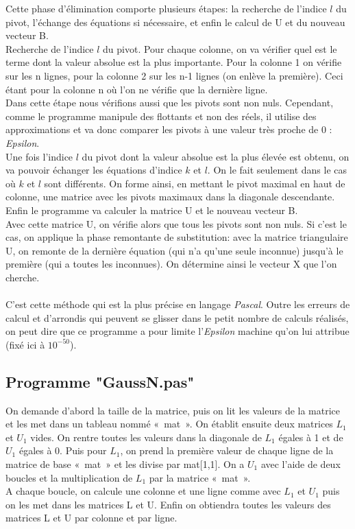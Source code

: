 \documentclass[a4paper,12pt]{report}
\begin{document}
Cette phase d'élimination comporte plusieurs étapes: la recherche de l'indice $l$ du pivot, l'échange des équations si nécessaire, et enfin le calcul de U et du nouveau vecteur B.\\

Recherche de l'indice $l$ du pivot.
Pour chaque colonne, on va vérifier quel est le terme dont la valeur absolue est la plus importante. Pour la colonne 1 on vérifie sur les n lignes, pour la colonne 2 sur les n-1 lignes (on enlève la première). Ceci étant pour la colonne n où l'on ne vérifie que la dernière ligne.\\

Dans cette étape nous vérifions aussi que les pivots sont non nuls. Cependant, comme le programme manipule des flottants et non des réels, il utilise des approximations et va donc comparer les pivots à une valeur très proche de 0 : \textit{Epsilon}.\\

Une fois l'indice $l$ du pivot dont la valeur absolue est la plus élevée est obtenu, on va pouvoir échanger les équations d'indice $k$ et $l$. On le fait seulement dans le cas où $k$ et $l$ sont différents. On forme ainsi, en mettant le pivot maximal en haut de colonne, une matrice avec les pivots maximaux dans la diagonale descendante.\\

Enfin le programme va calculer la matrice U et le nouveau vecteur B.
\\Avec cette matrice U, on vérifie alors que tous les pivots sont non nuls. Si c'est le cas, on applique la phase remontante de substitution: avec la matrice triangulaire U, on remonte de la dernière équation (qui n'a qu'une seule inconnue) jusqu'à le première (qui a toutes les inconnues). On détermine ainsi le vecteur X que l'on cherche.
\\\\C'est cette méthode qui est la plus précise en langage \textit{Pascal}. Outre les erreurs de calcul et d'arrondis qui peuvent se glisser dans le petit nombre de calculs réalisés, on peut dire que ce programme a pour limite l'\textit{Epsilon} machine qu'on lui attribue (fixé ici à $10^{-50}$). 

\subsection{Programme "GaussN.pas"}
On demande d'abord la taille de la matrice, puis on lit les valeurs de la matrice et les met dans un tableau nommé « mat ». On établit ensuite deux matrices $L_{1}$ et $U_{1}$ vides. On rentre toutes les valeurs dans la diagonale de $L_{1}$ égales à 1 et de $U_{1}$ égales à 0. Puis pour $L_{1}$, on prend la première valeur de chaque ligne de la matrice de base « mat » et les divise par mat[1,1]. On a $U_{1}$ avec l'aide de deux boucles et la multiplication de $L_{1}$ par la matrice « mat ».\\
A chaque boucle, on calcule une colonne et une ligne comme avec $L_{1}$ et $U_{1}$ puis on les met dans les matrices L et U. Enfin on obtiendra toutes les valeurs des matrices L et U par colonne et par ligne.
\newpage
\end{document}
